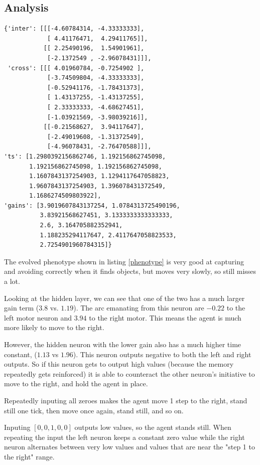 \documentclass[twoside]{article}
\begin{document}
\begin{multicols}{2}
    \section{Analysis}
    \begin{lstlisting}[caption=Evolved phenotype, label=phenotype]
{'inter': [[[-4.60784314, -4.33333333],
            [ 4.41176471,  4.29411765]],
           [[ 2.25490196,  1.54901961],
            [-2.1372549 , -2.96078431]]],
 'cross': [[[ 4.01960784, -0.7254902 ],
            [-3.74509804, -4.33333333],
            [-0.52941176, -1.78431373],
            [ 1.43137255, -1.43137255],
            [ 2.33333333, -4.68627451],
            [-1.03921569, -3.98039216]],
           [[-0.21568627,  3.94117647],
            [-2.49019608, -1.31372549],
            [-4.96078431, -2.76470588]]],
'ts': [1.2980392156862746, 1.192156862745098,
       1.192156862745098, 1.192156862745098,
       1.1607843137254903, 1.1294117647058823,
       1.9607843137254903, 1.396078431372549,
       1.1686274509803922],
'gains': [3.9019607843137254, 1.0784313725490196,
          3.83921568627451, 3.1333333333333333,
          2.6, 3.164705882352941,
          1.188235294117647, 2.4117647058823533,
          2.7254901960784315]}
    \end{lstlisting}

    The evolved phenotype shown in listing \ref{phenotype} is very good at capturing and avoiding correctly when it finds objects,
    but moves very slowly, so still misses a lot.

    Looking at the hidden layer,
    we can see that one of the two has a much larger gain term ($3.8$ vs. $1.19$).
    The arc emanating from this neuron are $-0.22$ to the left motor neuron and $3.94$ to the right motor.
    This means the agent is much more likely to move to the right.

    However, the hidden neuron with the lower gain also has a much higher time constant, ($1.13$ vs $1.96$).
    This neuron outputs negative to both the left and right outputs.
    So if this neuron gets to output high values (because the memory repeatedly gets reinforced) it is able to counteract the other neuron's initiative to move to the right,
    and hold the agent in place.

    Repeatedly inputing all zeroes makes the agent move 1 step to the right, stand still one tick, then move once again, stand still, and so on.

    Inputing $[0, 0, 1, 0, 0]$ outputs low values, so the agent stands still.
    When repeating the input the left neuron keeps a constant zero value while the right neuron alternates between very low values and values that are near the "step 1 to the right" range.

\end{multicols}

%
%
\end{document}
